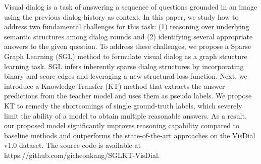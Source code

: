 Visual dialog is a task of answering a sequence of questions grounded in an image using the previous dialog history as context. In this paper, we study how to address two fundamental challenges for this task: (1) reasoning over underlying semantic structures among dialog rounds and (2) identifying several appropriate answers to the given question. To address these challenges, we propose a Sparse Graph Learning (SGL) method to formulate visual dialog as a graph structure learning task. SGL infers inherently sparse dialog structures by incorporating binary and score edges and leveraging a new structural loss function. Next, we introduce a Knowledge Transfer (KT) method that extracts the answer predictions from the teacher model and uses them as pseudo labels. We propose KT to remedy the shortcomings of single ground-truth labels, which severely limit the ability of a model to obtain multiple reasonable answers. As a result, our proposed model significantly improves reasoning capability compared to baseline methods and outperforms the state-of-the-art approaches on the VisDial v1.0 dataset. The source code is available at https://github.com/gicheonkang/SGLKT-VisDial.
